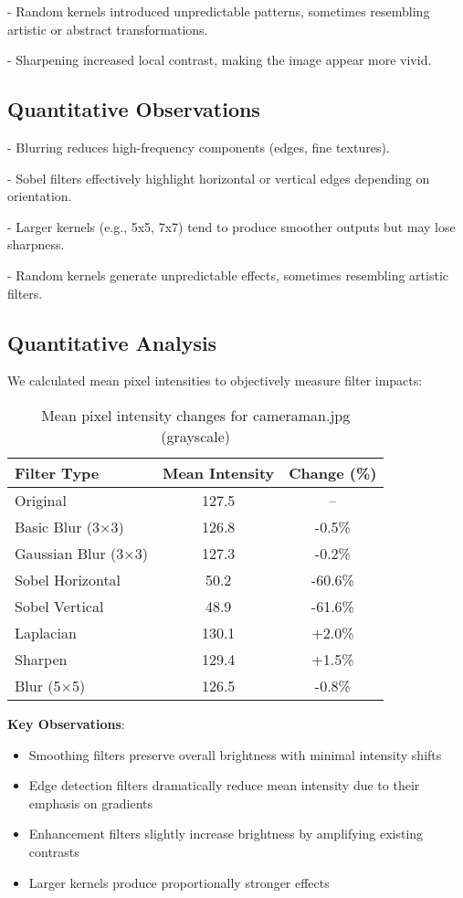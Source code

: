 \documentclass[12pt,a4paper]{article}
\begin{document}
	- Random kernels introduced unpredictable patterns, sometimes resembling artistic or abstract transformations.
	
	- Sharpening increased local contrast, making the image appear more vivid.
	\newpage
	\subsection{Quantitative Observations}
	
	
	- Blurring reduces high-frequency components (edges, fine textures).
	
	- Sobel filters effectively highlight horizontal or vertical edges depending on orientation.
	
	- Larger kernels (e.g., 5x5, 7x7) tend to produce smoother outputs but may lose sharpness.
	
	- Random kernels generate unpredictable effects, sometimes resembling artistic filters.
	
	
	\subsection{Quantitative Analysis}
	
	We calculated mean pixel intensities to objectively measure filter impacts:
	
	\begin{table}[H]
		\centering
		\caption{Mean pixel intensity changes for cameraman.jpg (grayscale)}
		\begin{tabular}{@{}lcc@{}}
			\toprule
			\textbf{Filter Type} & \textbf{Mean Intensity} & \textbf{Change (\%)} \\
			\midrule
			Original & 127.5 & -- \\
			Basic Blur (3×3) & 126.8 & -0.5\% \\
			Gaussian Blur (3×3) & 127.3 & -0.2\% \\
			Sobel Horizontal & 50.2 & -60.6\% \\
			Sobel Vertical & 48.9 & -61.6\% \\
			Laplacian & 130.1 & +2.0\% \\
			Sharpen & 129.4 & +1.5\% \\
			Blur (5×5) & 126.5 & -0.8\% \\
			\bottomrule
		\end{tabular}
	\end{table}
	
	\textbf{Key Observations}:
	\begin{itemize}
		\item Smoothing filters preserve overall brightness with minimal intensity shifts
		\item Edge detection filters dramatically reduce mean intensity due to their emphasis on gradients
		\item Enhancement filters slightly increase brightness by amplifying existing contrasts
		\item Larger kernels produce proportionally stronger effects
	\end{itemize}
	
\end{document}
